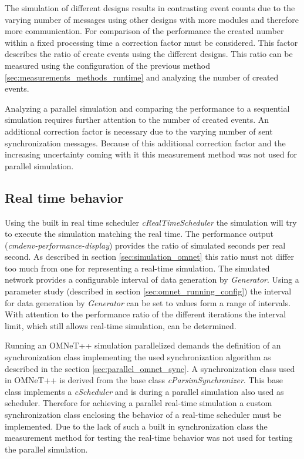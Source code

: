 The simulation of different designs results in contrasting event counts due to the varying number of messages using other designs with more modules and therefore more communication.
For comparison of the performance the created number within a fixed processing time a correction factor must be considered.
This factor describes the ratio of create events using the different designs.
This ratio can be measured using the configuration of the previous method \ref{sec:measurements_methods_runtime} and analyzing the number of created events.

Analyzing a parallel simulation and comparing the performance to a sequential simulation requires further attention to the number of created events.
An additional correction factor is necessary due to the varying number of sent synchronization messages.
Because of this additional correction factor and the increasing uncertainty coming with it this measurement method was not used for parallel simulation.

\subsection{Real time behavior}
\label{sec:measurements_methods_realtime}
Using the built in real time scheduler \emph{cRealTimeScheduler} the simulation will try to execute the simulation matching the real time.
The performance output (\emph{cmdenv-performance-display}) provides the ratio of simulated seconds per real second.
As described in section \ref{sec:simulation_omnet} this ratio must not differ too much from one for representing a real-time simulation.
The simulated network provides a configurable interval of data generation by \emph{Generator}.
Using a parameter study (described in section \ref{sec:omnet_running_config}) the interval for data generation by \emph{Generator} can be set to values form a range of intervals.
With attention to the performance ratio of the different iterations the interval limit, which still allows real-time simulation, can be determined.

Running an OMNeT++ simulation parallelized demands the definition of an synchronization class implementing the used synchronization algorithm as described in the section \ref{sec:parallel_omnet_sync}.
A synchronization class used in OMNeT++ is derived from the base class \emph{cParsimSynchronizer}.
This base class implements a \emph{cScheduler} and is during a parallel simulation also used as scheduler.
Therefore for achieving a parallel real-time simulation a custom synchronization class enclosing the behavior of a real-time scheduler must be implemented.
Due to the lack of such a built in synchronization class the measurement method for testing the real-time behavior was not used for testing the parallel simulation.

